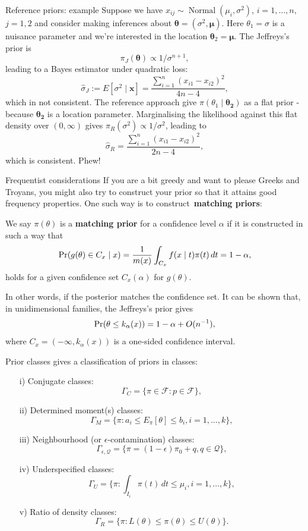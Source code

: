 \begin{frame}{Reference priors: example}
Suppose we have $x_{ij} \sim \operatorname{Normal}(\mu_i, \sigma^2)$, $i = 1, \ldots, n$, $j=1,2$ and consider making inferences about $\boldsymbol{\theta} = (\sigma^2, \boldsymbol{\mu})$.
Here $\theta_1 = \sigma$ is a nuisance parameter and we're interested in the location $\boldsymbol{\theta}_2 = \boldsymbol{\mu}$.
The Jeffreys's prior is 
$$\pi_J(\boldsymbol{\theta}) \propto 1/\sigma^{n+1},$$
leading to a Bayes estimator under quadratic loss:
$$ \hat{\sigma}_J := E[\sigma^2 \mid \boldsymbol{x}] = \frac{\sum_{i=1}^n (x_{i1}-x_{i2})^2}{4n-4},$$
which in not consistent.
The reference approach give $\pi(\theta_1 \mid \boldsymbol{\theta_2})$ as a flat prior - because $\boldsymbol{\theta_2}$ is a location parameter.
Marginalising the likelihood against this flat density over $(0,\infty)$ gives $\pi_R(\sigma^2) \propto 1/\sigma^2$, leading to
$$ \hat{\sigma}_R =\frac{\sum_{i=1}^n (x_{i1}-x_{i2})^2}{2n-4},$$
which is consistent.
Phew!
\end{frame}
\begin{frame}{Frequentist considerations}
If you are a bit greedy and want to please Greeks and Troyans, you might also try to construct your prior so that it attains good frequency properties. 
One such way is to construct~\textbf{matching priors}:
\begin{defn}
 We say $\pi(\theta)$ is a \textbf{matching prior} for a confidence level $\alpha$ if it is constructed in such a way that  
 \begin{equation*}
  \operatorname{Pr}(g(\theta) \in C_x \mid x) = \frac{1}{m(x)}\int_{C_x} f(x\mid t) \pi(t) \, dt = 1-\alpha,
 \end{equation*}
holds for a given confidence set $C_x(\alpha)$ for $g(\theta)$.
\end{defn}
In other words, if the posterior matches the confidence set.
It can be shown that, in unidimensional families, the Jeffreys's prior gives
$$ \operatorname{Pr}(\theta \leq k_\alpha(x)) = 1-\alpha + O(n^{-1}),$$
where $C_x = (-\infty, k_\alpha(x))$ is a one-sided confidence interval.
\end{frame}
\begin{frame}{Prior classes}
\cite{Robert2007} gives a classification of priors in classes:
\begin{itemize}
 \item[i)] Conjugate classes:
  $$ \Gamma_C = \{\pi \in \mathcal{F} : p \in \mathcal{F} \}, $$
 \item[ii)] Determined moment(s) classes:
 $$ \Gamma_M = \{\pi : a_i \leq E_\pi[\theta] \leq b_i, i = 1, \ldots, k\}, $$
 \item[iii)] Neighbourhood (or $\epsilon$-contamination) classes:
  $$ \Gamma_{\epsilon, \mathcal{Q}} = \{\pi = (1-\epsilon)\pi_0 + q, q \in \mathcal{Q}\}, $$
 \item[iv)] Underspecified classes:
   $$ \Gamma_{U} = \{\pi : \int_{I_i} \pi(t)\,dt \leq \mu_i, i = 1, \ldots, k\}, $$
 \item[v)] Ratio of density classes:
    $$ \Gamma_{R} = \{\pi : L(\theta) \leq \pi(\theta) \leq U(\theta)\}. $$
\end{itemize}
\end{frame}
